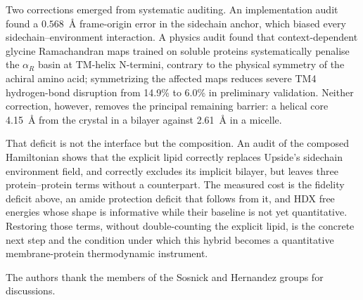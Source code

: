 \documentclass[journal=jctcce,manuscript=article,layout=twocolumn]{achemso}
\begin{document}
Two corrections emerged from systematic auditing. An implementation audit found a
$0.568$~\AA{} frame-origin error in the sidechain anchor, which biased every
sidechain--environment interaction. A physics audit found that context-dependent
glycine Ramachandran maps trained on soluble proteins systematically penalise the
$\alpha_R$ basin at TM-helix N-termini, contrary to the physical symmetry of the
achiral amino acid; symmetrizing the affected maps reduces severe TM4
hydrogen-bond disruption from 14.9\% to 6.0\% in preliminary validation. Neither
correction, however, removes the principal remaining barrier: a helical core 4.15~\AA{}
from the crystal in a bilayer against 2.61~\AA{} in a micelle.

That deficit is not the interface but the composition. An audit of the composed
Hamiltonian shows that the explicit lipid correctly replaces Upside's sidechain
environment field, and correctly excludes its implicit bilayer, but leaves three
protein--protein terms without a counterpart. The measured cost is the fidelity
deficit above, an amide protection deficit that follows from it, and HDX free energies
whose shape is informative while their baseline is not yet quantitative. Restoring
those terms, without double-counting the explicit lipid, is the concrete next step and
the condition under which this hybrid becomes a quantitative membrane-protein
thermodynamic instrument.

\begin{acknowledgement}
The authors thank the members of the Sosnick and Hernandez groups for discussions.
\end{acknowledgement}
\end{document}
